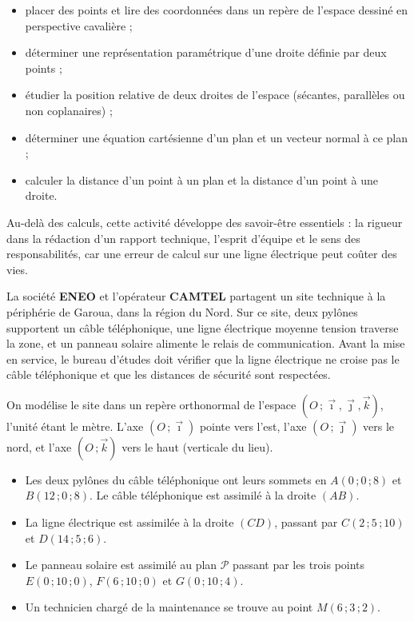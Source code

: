 \documentclass[11pt]{article}
\newcounter{popsec}
\newcounter{popsub}
\newcommand{\courssub}[1]{%
  \stepcounter{popsub}%
  \par\vspace{9pt}\noindent{\popxbold\fontsize{11.5}{13}\selectfont\color{popink}{\color{poporange}\thepopsec.\thepopsub}\hspace{6pt}#1}\par\nopagebreak\vspace{4pt}
}
\begin{document}
\begin{itemize}
\item placer des points et lire des coordonnées dans un repère de l'espace dessiné en perspective cavalière ;
\item déterminer une représentation paramétrique d'une droite définie par deux points ;
\item étudier la position relative de deux droites de l'espace (sécantes, parallèles ou non coplanaires) ;
\item déterminer une équation cartésienne d'un plan et un vecteur normal à ce plan ;
\item calculer la distance d'un point à un plan et la distance d'un point à une droite.
\end{itemize}

Au-delà des calculs, cette activité développe des savoir-être essentiels : la rigueur dans la rédaction d'un rapport technique, l'esprit d'équipe et le sens des responsabilités, car une erreur de calcul sur une ligne électrique peut coûter des vies.

\courssub{Situation}

La société \textbf{ENEO} et l'opérateur \textbf{CAMTEL} partagent un site technique à la périphérie de Garoua, dans la région du Nord. Sur ce site, deux pylônes supportent un câble téléphonique, une ligne électrique moyenne tension traverse la zone, et un panneau solaire alimente le relais de communication. Avant la mise en service, le bureau d'études doit vérifier que la ligne électrique ne croise pas le câble téléphonique et que les distances de sécurité sont respectées.

On modélise le site dans un repère orthonormal de l'espace $(O\,;\vec{\imath},\vec{\jmath},\vec{k})$, l'unité étant le mètre. L'axe $(O\,;\vec{\imath})$ pointe vers l'est, l'axe $(O\,;\vec{\jmath})$ vers le nord, et l'axe $(O\,;\vec{k})$ vers le haut (verticale du lieu).

\begin{itemize}
\item Les deux pylônes du câble téléphonique ont leurs sommets en $A(0\,;0\,;8)$ et $B(12\,;0\,;8)$. Le câble téléphonique est assimilé à la droite $(AB)$.
\item La ligne électrique est assimilée à la droite $(CD)$, passant par $C(2\,;5\,;10)$ et $D(14\,;5\,;6)$.
\item Le panneau solaire est assimilé au plan $\mathcal{P}$ passant par les trois points $E(0\,;10\,;0)$, $F(6\,;10\,;0)$ et $G(0\,;10\,;4)$.
\item Un technicien chargé de la maintenance se trouve au point $M(6\,;3\,;2)$.
\end{itemize}
\end{document}
